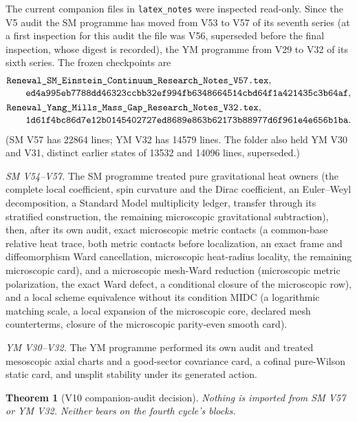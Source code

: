 \documentclass[11pt]{article}
\theoremstyle{plain}
\newtheorem{theorem}{Theorem}[section]
\theoremstyle{definition}
\theoremstyle{remark}
\begin{document}
The current companion files in \texttt{latex\_notes} were inspected
read-only.  Since the V5 audit the SM programme has moved from V53 to
V57 of its seventh series (at a first inspection for this audit the
file was V56, superseded before the final inspection, whose digest is
recorded), the YM programme from V29 to V32 of its sixth series.  The
frozen checkpoints are
\begin{align}
 &\texttt{Renewal\_SM\_Einstein\_Continuum\_Research\_Notes\_V57.tex},
 \notag\\[-2pt]
 &\qquad
 \texttt{ed4a995eb7788dd46323ccbb32ef994fb6348664514cbd64f1a421435c3b64af},
 \label{eq:c4v10-SM-checkpoint}\\
 &\texttt{Renewal\_Yang\_Mills\_Mass\_Gap\_Research\_Notes\_V32.tex},
 \notag\\[-2pt]
 &\qquad
 \texttt{1d61f4bc86d7e12b0145402727ed8689e863b62173b88977d6f961e4e656b1ba}.
 \label{eq:c4v10-YM-checkpoint}
\end{align}
(SM V57 has 22864 lines; YM V32 has 14579 lines.  The folder also
held YM V30 and V31, distinct earlier states of 13532 and 14096 lines,
superseded.)

\emph{SM V54--V57.}  The SM programme treated pure gravitational heat
owners (the complete local coefficient, spin curvature and the Dirac
coefficient, an Euler--Weyl decomposition, a Standard Model
multiplicity ledger, transfer through its stratified construction,
the remaining microscopic gravitational subtraction), then, after
its own audit, exact microscopic metric contacts (a common-base
relative heat trace, both metric contacts before localization, an
exact frame and diffeomorphism Ward cancellation, microscopic
heat-radius locality, the remaining microscopic card), and a
microscopic mesh-Ward reduction (microscopic metric polarization,
the exact Ward defect, a conditional closure of the microscopic
row), and a local scheme equivalence without its condition MIDC (a
logarithmic matching scale, a local expansion of the microscopic
core, declared mesh counterterms, closure of the microscopic
parity-even smooth card).

\emph{YM V30--V32.}  The YM programme performed its own audit and
treated mesoscopic axial charts and a good-sector covariance card,
a cofinal pure-Wilson static card, and unsplit stability under its
generated action.

\begin{theorem}[V10 companion-audit decision]
\label{thm:c4v10-companion-decision}
Nothing is imported from SM V57 or YM V32.  Neither bears on the
fourth cycle's blocks.
\end{theorem}
\end{document}
